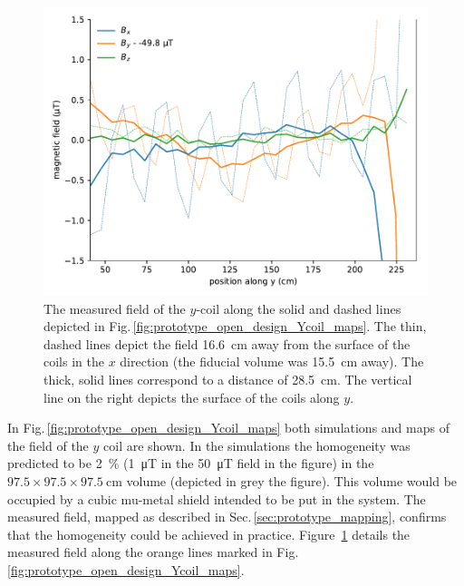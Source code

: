 \begin{figure}
  \centering
  \includegraphics[width=\linewidth]{gfx/prototype/open_planar_map_Y_By_section.pdf}
  \caption{The measured field of the $y$-coil along the solid and dashed lines depicted in Fig.\,\ref{fig:prototype_open_design_Ycoil_maps}. The thin, dashed lines depict the field \SI{16.6}{\centi\metre} away from the surface of the coils in the $x$ direction (the fiducial volume was \SI{15.5}{\centi\metre} away). The thick, solid lines correspond to a distance of \SI{28.5}{\centi\metre}. The vertical line on the right depicts the surface of the coils along $y$.}\label{fig:prototype_open_design_Ycoil_map_section}
\end{figure}

In Fig.\,\ref{fig:prototype_open_design_Ycoil_maps} both simulations and maps of the field of the $y$ coil are shown.
In the simulations the homogeneity was predicted to be \SI{2}{\percent} (\SI{1}{\micro\tesla} in the \SI{50}{\micro\tesla} field in the figure) in the $97.5 \times 97.5 \times \SI{97.5}{\centi\metre}$ volume (depicted in grey the figure). This volume would be occupied by a cubic mu-metal shield intended to be put in the system. The measured field, mapped as described in Sec.\,\ref{sec:prototype_mapping}, confirms that the homogeneity could be achieved in practice. Figure~\ref{fig:prototype_open_design_Ycoil_map_section} details the measured field along the orange lines marked in Fig.\,\ref{fig:prototype_open_design_Ycoil_maps}.

